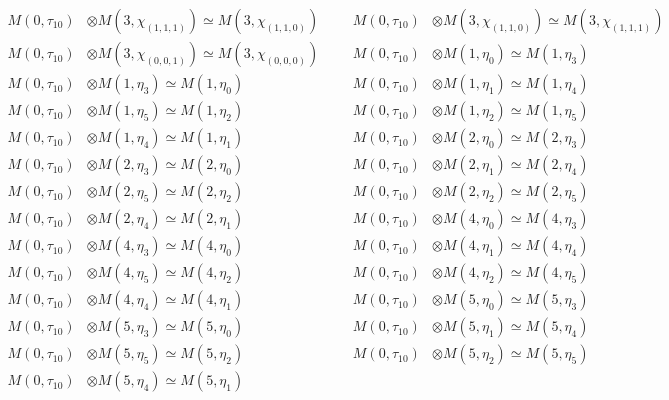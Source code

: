 \begin{align*}
M(0,\tau_{10}) &\otimes M(3,\chi_{(1,1,1)}) \simeq M(3,\chi_{(1,1,0)}) &&& M(0,\tau_{10}) &\otimes M(3,\chi_{(1,1,0)}) \simeq M(3,\chi_{(1,1,1)})\\
M(0,\tau_{10}) &\otimes M(3,\chi_{(0,0,1)}) \simeq M(3,\chi_{(0,0,0)}) &&& M(0,\tau_{10}) &\otimes M(1,\eta_{0}) \simeq M(1,\eta_{3})\\
M(0,\tau_{10}) &\otimes M(1,\eta_{3}) \simeq M(1,\eta_{0}) &&& M(0,\tau_{10}) &\otimes M(1,\eta_{1}) \simeq M(1,\eta_{4})\\
M(0,\tau_{10}) &\otimes M(1,\eta_{5}) \simeq M(1,\eta_{2}) &&& M(0,\tau_{10}) &\otimes M(1,\eta_{2}) \simeq M(1,\eta_{5})\\
M(0,\tau_{10}) &\otimes M(1,\eta_{4}) \simeq M(1,\eta_{1}) &&& M(0,\tau_{10}) &\otimes M(2,\eta_{0}) \simeq M(2,\eta_{3})\\
M(0,\tau_{10}) &\otimes M(2,\eta_{3}) \simeq M(2,\eta_{0}) &&& M(0,\tau_{10}) &\otimes M(2,\eta_{1}) \simeq M(2,\eta_{4})\\
M(0,\tau_{10}) &\otimes M(2,\eta_{5}) \simeq M(2,\eta_{2}) &&& M(0,\tau_{10}) &\otimes M(2,\eta_{2}) \simeq M(2,\eta_{5})\\
M(0,\tau_{10}) &\otimes M(2,\eta_{4}) \simeq M(2,\eta_{1}) &&& M(0,\tau_{10}) &\otimes M(4,\eta_{0}) \simeq M(4,\eta_{3})\\
M(0,\tau_{10}) &\otimes M(4,\eta_{3}) \simeq M(4,\eta_{0}) &&& M(0,\tau_{10}) &\otimes M(4,\eta_{1}) \simeq M(4,\eta_{4})\\
M(0,\tau_{10}) &\otimes M(4,\eta_{5}) \simeq M(4,\eta_{2}) &&& M(0,\tau_{10}) &\otimes M(4,\eta_{2}) \simeq M(4,\eta_{5})\\
M(0,\tau_{10}) &\otimes M(4,\eta_{4}) \simeq M(4,\eta_{1}) &&& M(0,\tau_{10}) &\otimes M(5,\eta_{0}) \simeq M(5,\eta_{3})\\
M(0,\tau_{10}) &\otimes M(5,\eta_{3}) \simeq M(5,\eta_{0}) &&& M(0,\tau_{10}) &\otimes M(5,\eta_{1}) \simeq M(5,\eta_{4})\\
M(0,\tau_{10}) &\otimes M(5,\eta_{5}) \simeq M(5,\eta_{2}) &&& M(0,\tau_{10}) &\otimes M(5,\eta_{2}) \simeq M(5,\eta_{5})\\
M(0,\tau_{10}) &\otimes M(5,\eta_{4}) \simeq M(5,\eta_{1})
\end{align*}

